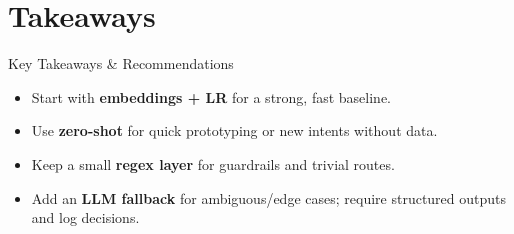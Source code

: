 \documentclass[aspectratio=169]{beamer}
\begin{document}
\section{Takeaways}

\begin{frame}{Key Takeaways \& Recommendations}
  \begin{itemize}
    \item Start with \textbf{embeddings + LR} for a strong, fast baseline.
    \item Use \textbf{zero-shot} for quick prototyping or new intents without data.
    \item Keep a small \textbf{regex layer} for guardrails and trivial routes.
    \item Add an \textbf{LLM fallback} for ambiguous/edge cases; require structured outputs and log decisions.
  \end{itemize}
\end{frame}
\end{document}
